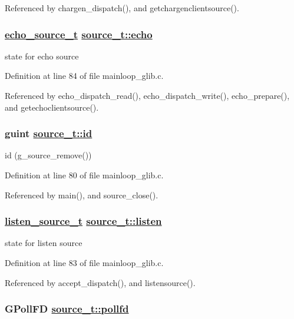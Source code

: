 Referenced by chargen\_\-dispatch(), and getchargenclientsource().\hypertarget{structsource__t_o4}{
\subsubsection[echo]{\setlength{\rightskip}{0pt plus 5cm}\hyperlink{structecho__source__t}{echo\_\-source\_\-t} \hyperlink{structsource__t_o4}{source\_\-t::echo}}}
\label{structsource__t_o4}


state for echo source 



Definition at line 84 of file mainloop\_\-glib.c.

Referenced by echo\_\-dispatch\_\-read(), echo\_\-dispatch\_\-write(), echo\_\-prepare(), and getechoclientsource().\hypertarget{structsource__t_o2}{
\subsubsection[id]{\setlength{\rightskip}{0pt plus 5cm}guint \hyperlink{structsource__t_o2}{source\_\-t::id}}}
\label{structsource__t_o2}


id (g\_\-source\_\-remove()) 



Definition at line 80 of file mainloop\_\-glib.c.

Referenced by main(), and source\_\-close().\hypertarget{structsource__t_o3}{
\subsubsection[listen]{\setlength{\rightskip}{0pt plus 5cm}\hyperlink{structlisten__source__t}{listen\_\-source\_\-t} \hyperlink{structsource__t_o3}{source\_\-t::listen}}}
\label{structsource__t_o3}


state for listen source 



Definition at line 83 of file mainloop\_\-glib.c.

Referenced by accept\_\-dispatch(), and listensource().\hypertarget{structsource__t_o1}{
\subsubsection[pollfd]{\setlength{\rightskip}{0pt plus 5cm}GPoll\-FD \hyperlink{structsource__t_o1}{source\_\-t::pollfd}}}
\label{structsource__t_o1}


